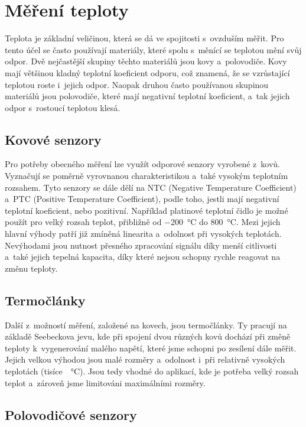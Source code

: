\section{Měření teploty}

Teplota je základní veličinou, která se dá ve spojitosti s~ovzduším měřit. Pro tento účel se často používají materiály, které spolu s~měnící se teplotou mění svůj odpor. Dvě nejčastější skupiny těchto materiálů jsou kovy a~polovodiče. Kovy mají většinou kladný teplotní koeficient odporu, což znamená, že se vzrůstající teplotou roste i~jejich odpor. Naopak druhou často používanou skupinou materiálů jsou polovodiče, které mají negativní teplotní koeficient, a~tak jejich odpor s~rostoucí teplotou klesá.

\subsection{Kovové senzory}

Pro potřeby obecného měření lze využít odporové senzory vyrobené z~kovů. Vyznačují se poměrně vyrovnanou charakteristikou a~také vysokým teplotním rozsahem. Tyto senzory se dále dělí na NTC (Negative Temperature Coefficient) a~PTC (Positive Temperature Coefficient), podle toho, jestli mají negativní teplotní koeficient, nebo pozitivní. Například platinové teplotní čidlo je možné použít pro velký rozsah teplot, přibližně od \SI{-200}{\celsius} do \SI{800}{\celsius}. Mezi jejich hlavní výhody patří již zmíněná linearita a~odolnost při vysokých teplotách. Nevýhodami jsou nutnost přesného zpracování signálu díky menší citlivosti a~také jejich tepelná kapacita, díky které nejsou schopny rychle reagovat na změnu teploty.

\subsection{Termočlánky}

Další z~možností měření, založené na kovech, jsou termočlánky. Ty pracují na základě Seebeckova jevu, kde při spojení dvou různých kovů dochází při změně teploty k~vygenerování malého napětí, které jsme schopni po zesílení dále měřit. Jejich velkou výhodou jsou malé rozměry a~odolnost i~při relativně vysokých teplotách (tisíce~\SI{}{\celsius}). Jsou tedy vhodné do aplikací, kde je potřeba velký rozsah teplot a~zároveň jsme limitováni maximálními rozměry.

\subsection{Polovodičové senzory}

